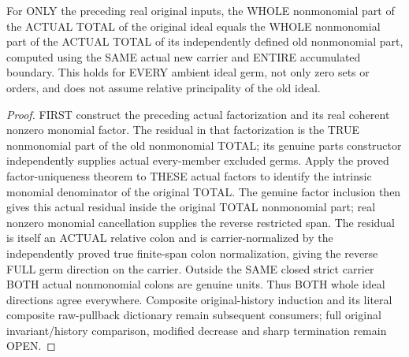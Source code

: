 \begin{theorem}
\label{hir:sharp-actual-whole-total-nonmonomial-parts-transport}
\leanok
For ONLY the preceding real original inputs, the WHOLE nonmonomial part
of the ACTUAL TOTAL of the original ideal equals the WHOLE nonmonomial
part of the ACTUAL TOTAL of its independently defined old nonmonomial
part, computed using the SAME actual new carrier and ENTIRE accumulated
boundary. This holds for EVERY ambient ideal germ, not only zero sets or
orders, and does not assume relative principality of the old ideal.
\end{theorem}
\begin{proof}
FIRST construct the preceding actual factorization and its real coherent
nonzero monomial factor. The residual in that factorization is the TRUE
nonmonomial part of the old nonmonomial TOTAL; its genuine parts constructor
independently supplies actual every-member excluded germs. Apply the proved
factor-uniqueness theorem to THESE actual factors to identify the intrinsic
monomial denominator of the original TOTAL. The genuine factor inclusion
then gives this actual residual inside the original TOTAL nonmonomial part;
real nonzero monomial cancellation supplies the reverse restricted span.
The residual is itself an ACTUAL relative colon and is carrier-normalized
by the independently proved true finite-span colon normalization, giving
the reverse FULL germ direction on the carrier. Outside the SAME closed
strict carrier BOTH actual nonmonomial colons are genuine units. Thus
BOTH whole ideal directions agree everywhere. Composite original-history
induction and its literal composite raw-pullback dictionary remain subsequent
consumers; full original invariant/history comparison, modified decrease
and sharp termination remain OPEN.
\end{proof}
